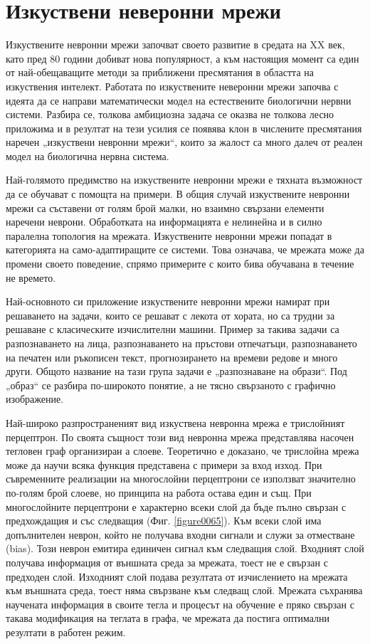 \section{Изкуствени неверонни мрежи}

Изкуствените невронни мрежи започват своето развитие в средата на XX век, като пред 80 години добиват нова популярност, а към настоящия момент са един от най-обещаващите методи за приближени пресмятания в областта на изкуствения интелект. Работата по изкуствените неверонни мрежи започва с идеята да се направи математически модел на естествените биологични нервни системи. Разбира се, толкова амбициозна задача се оказва не толкова лесно приложима и в резултат на тези усилия се появява клон в числените пресмятания наречен „изкуствени невронни мрежи“, които за жалост са много далеч от реален модел на биологична нервна система. 

Най-голямото предимство на изкуствените невронни мрежи е тяхната възможност да се обучават с помощта на примери. В общия случай изкуствените невронни мрежи са съставени от голям брой малки, но взаимно свързани елементи наречени неврони. Обработката на информацията е нелинейна и в силно паралелна топология на мрежата. Изкуствените невронни мрежи попадат в категорията на само-адаптиращите се системи. Това означава, че мрежата може да промени своето поведение, спрямо примерите с които бива обучавана в течение не времето. 

Най-основното си приложение изкуствените невронни мрежи намират при решаването на задачи, които се решават с лекота от хората, но са трудни за решаване с класическите изчислителни машини. Пример за такива задачи са разпознаването на лица, разпознаването на пръстови отпечатъци, разпознаването на печатен или ръкописен текст, прогнозирането на времеви редове и много други. Общото название на тази група задачи е „разпознаване на образи“. Под „образ“ се разбира по-широкото понятие, а не тясно свързаното с графично изображение. 

Най-широко разпространеният вид изкуствена невронна мрежа е трислойният перцептрон. По своята същност този вид невронна мрежа представлява насочен тегловен граф организиран а слоеве. Теоретично е доказано, че трислойна мрежа може да научи всяка функция представена с примери за вход изход. При съвременните реализации на многослойни перцептрони се използват значително по-голям брой слоеве, но принципа на работа остава един и същ. При многослойните перцептрони е характерно всеки слой да бъде пълно свързан с предхождащия и със следващия (Фиг. \ref{figure0065}). Към всеки слой има допълнителен неврон, който не получава входни сигнали и служи за отместване (bias). Този неврон емитира единичен сигнал към следващия слой. Входният слой получава информация от външната среда за мрежата, тоест не е свързан с предходен слой. Изходният слой подава резултата от изчислението на мрежата към външната среда, тоест няма свързване към следващ слой. Мрежата съхранява научената информация в своите тегла и процесът на обучение е пряко свързан с такава модификация на теглата в графа, че мрежата да постига оптимални резултати в работен режим. 

